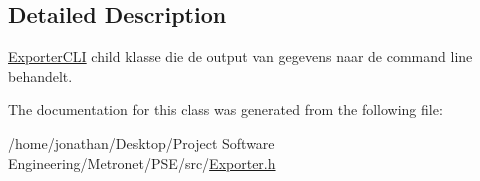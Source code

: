 \subsection{Detailed Description}
\hyperlink{class_exporter_c_l_i}{Exporter\+C\+LI} child klasse die de output van gegevens naar de command line behandelt. 

The documentation for this class was generated from the following file\+:\begin{DoxyCompactItemize}
\item 
/home/jonathan/\+Desktop/\+Project Software Engineering/\+Metronet/\+P\+S\+E/src/\hyperlink{_exporter_8h}{Exporter.\+h}\end{DoxyCompactItemize}
